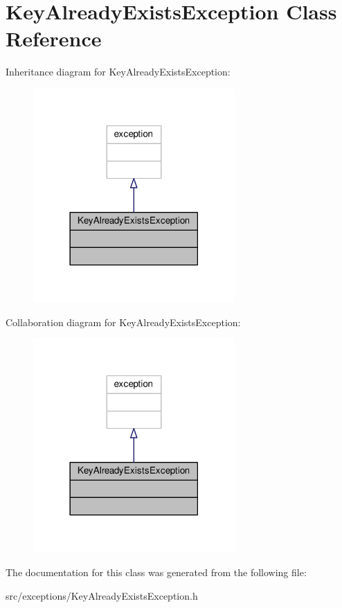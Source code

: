 \hypertarget{classKeyAlreadyExistsException}{}\section{Key\+Already\+Exists\+Exception Class Reference}
\label{classKeyAlreadyExistsException}


Inheritance diagram for Key\+Already\+Exists\+Exception\+:\nopagebreak
\begin{figure}[H]
\begin{center}
\leavevmode
\includegraphics[width=218pt]{df/dbb/classKeyAlreadyExistsException__inherit__graph}
\end{center}
\end{figure}


Collaboration diagram for Key\+Already\+Exists\+Exception\+:\nopagebreak
\begin{figure}[H]
\begin{center}
\leavevmode
\includegraphics[width=218pt]{dc/d5c/classKeyAlreadyExistsException__coll__graph}
\end{center}
\end{figure}


The documentation for this class was generated from the following file\+:\begin{DoxyCompactItemize}
\item 
src/exceptions/Key\+Already\+Exists\+Exception.\+h\end{DoxyCompactItemize}
